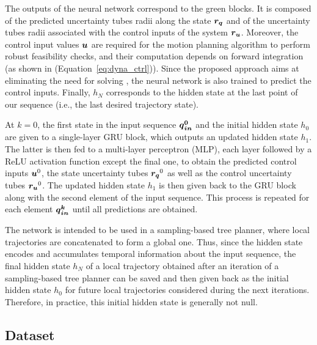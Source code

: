 The outputs of the neural network correspond to the green blocks.
It is composed of the predicted uncertainty tubes radii along the state $\boldsymbol{r_q}$ and of the uncertainty tubes radii associated with the control inputs of the system $\boldsymbol{r_u}$.
Moreover, the control input values $\boldsymbol{u}$ are required for the motion planning algorithm to perform robust feasibility checks, and their computation depends on  forward integration (as shown in (Equation~\ref{eq:dyna_ctrl})). 
Since the proposed approach aims at eliminating the need for solving , the neural network is also trained to predict the control inputs.
Finally, $h_{N}$ corresponds to the hidden state at the last point of our sequence (i.e., the last desired trajectory state).

At $k=0$, the first state in the input sequence $\boldsymbol{\boldsymbol{q}_{in}^0}$ and the initial hidden state $h_0$ are given to a single-layer GRU block, which outputs an updated hidden state $h_1$. 
The latter is then fed to a multi-layer perceptron (MLP), each layer followed by a ReLU activation function except the final one, to obtain the predicted control inputs $\boldsymbol{u}^0$, the state uncertainty tubes $\boldsymbol{r_q}^0$ as well as the control uncertainty tubes $\boldsymbol{r_u}^0$. 
The updated hidden state $h_1$ is then given back to the GRU block along with the second element of the input sequence. 
This process is repeated for each element $\boldsymbol{\boldsymbol{q}_{in}^k}$ until all predictions are obtained.

The network is intended to be used in a sampling-based tree planner, where local trajectories are concatenated to form a global one. 
Thus, since the hidden state encodes and accumulates temporal information about the input sequence, the final hidden state $h_{N}$ of a local trajectory obtained after an iteration of a sampling-based tree planner can be saved and then given back as the initial hidden state $h_{0}$ for future local trajectories considered during the next iterations. 
Therefore, in practice, this initial hidden state is generally not null.

\subsection{Dataset}

